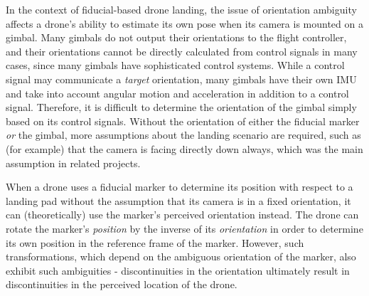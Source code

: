 In the context of fiducial-based drone landing, the issue of orientation ambiguity affects a drone's ability to
estimate its own pose when its camera is mounted on a gimbal.
Many gimbals do not output their orientations to the flight controller, and their orientations cannot be directly
calculated from control signals in many cases, since many gimbals have sophisticated control systems.
While a control signal may communicate a \textit{target} orientation,
many gimbals have their own IMU and take into account angular motion and acceleration in addition to a control signal.
Therefore, it is difficult to determine the orientation of the gimbal simply based on its control signals.
Without the orientation of either the fiducial marker \textit{or} the gimbal, more assumptions about
the landing scenario are required, such as (for example) that the camera is facing directly down always,
which was the main assumption in related projects.

When a drone uses a fiducial marker to determine its position with respect to a landing pad without the assumption
that its camera is in a fixed orientation, it can (theoretically) use the marker's perceived orientation instead.
The drone can rotate the marker's \textit{position} by the inverse of its \textit{orientation} in order to determine
its own position in the reference frame of the marker.
However, such transformations, which depend on the ambiguous orientation of the marker, also exhibit such ambiguities -
discontinuities in the orientation ultimately result in discontinuities in the perceived location of the drone.


